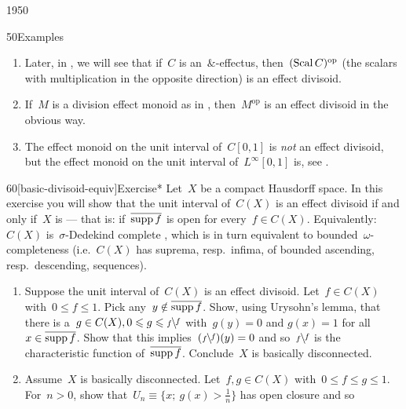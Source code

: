 \begin{parsec}{1950}
\begin{point}{50}{Examples}
\begin{enumerate}
    are effect divisoids,
    then~$M_1 \times M_2$
    is an effect divisoid
    with~$\rfrac{(a_1,a_2)}{(b_1,b_2)} =
    (\rfrac{a_1}{b_1}, \rfrac{a_2}{b_2})$.
In particular~$[0,1]^n$ is an effect divisoid
    with component-wise partial division.
\item
Later, in ,
    we will see that if~$C$ is an~$\&$-effectus,
then~$(\operatorname{Scal} C)^{\mathrm{op}}$ (the scalars with multiplication in the
    opposite direction)
    is an effect divisoid.
\item
If~$M$ is a division effect monoid as in \cite[Dfn.~6.3]{kentapartial},
then~$M^{\textrm{op}}$ is an effect divisoid in the obvious way.
\item
The effect monoid on the unit interval of~$C[0,1]$
    is \emph{not} an effect divisoid,
    but the effect monoid on the unit interval of~$L^\infty[0,1]$
    is, see .
\end{enumerate}
\end{point}
\begin{point}{60}[basic-divisoid-equiv]{Exercise*}%
Let~$X$ be a compact Hausdorff space.
In this exercise you will show
    that the unit interval of~$C(X)$
    is an effect divisoid
    if and only if~$X$
    is 
    \cite[1H]{gillman2013rings}
    --- that is: if~$\overline{\operatorname{supp} f}$ is open
    for every~$f \in C(X)$.
Equivalently:
$C(X)$ is~$\sigma$-Dedekind complete
    \cite[3N.5]{gillman2013rings},
    which is in turn equivalent to bounded~$\omega$-completeness
    (i.e.~$C(X)$ has suprema, resp.~infima, of
            bounded ascending, resp.~descending, sequences).
\begin{enumerate}
\item
    Suppose the unit interval of~$C(X)$ is an effect divisoid.
        Let~$f \in C(X)$ with~$0 \leq f \leq 1$.
    Pick any~$y \notin \overline{\operatorname{supp} f}$.
    Show, using Urysohn's lemma,
    that there is a~$g \in C(X), 0\leq g \leq \rfrac{f}{f}$
    with~$g(y) = 0$ and $g(x) = 1$ for all~$x \in \overline{\operatorname{supp} f}$.
    Show that this implies~$(\rfrac{f}{f})(y) = 0$
        and so~$\rfrac{f}{f}$ is the characteristic function
    of~$\overline{\operatorname{supp} f}$.  Conclude~$X$ is basically disconnected.
\item
Assume~$X$ is basically disconnected.
Let~$f,g\in C(X)$ with~$0 \leq f \leq g \leq 1$.
For~$n > 0$,
show that~$U_n \equiv \{ x;\ g(x) > \frac{1}{n} \}$
has open closure and so
\begin{equation*}

\end{equation*}
\end{enumerate}
\end{point}
\end{parsec}
